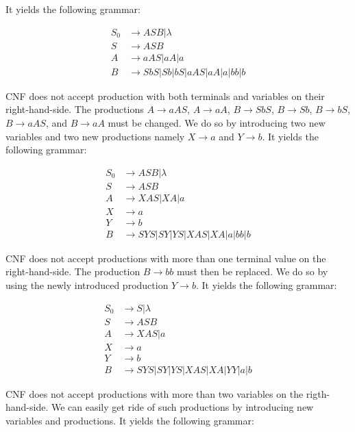 \begin{enumerate}[label={(\alph*)}]
    It yields the following grammar:
    
    \begin{align*}
        S_0 &\rightarrow ASB | \lambda\\
        S &\rightarrow ASB\\
        A &\rightarrow aAS | aA | a\\
        B &\rightarrow SbS | Sb | bS | aAS | aA | a | bb | b
    \end{align*}
    
    \noindent CNF does not accept production with both terminals and variables on their right-hand-side. The productions $A \rightarrow aAS$, $A \rightarrow aA$, $B \rightarrow SbS$, $B \rightarrow Sb$, $B \rightarrow bS$, $B \rightarrow aAS$, and $B \rightarrow aA$ must be changed. We do so by introducing two new variables and two new productions namely $X \rightarrow a$ and $Y \rightarrow b$. It yields the following grammar:
    
    \begin{align*}
        S_0 &\rightarrow ASB | \lambda\\
        S &\rightarrow ASB\\
        A &\rightarrow XAS | XA | a\\
        X &\rightarrow a\\
        Y &\rightarrow b\\
        B &\rightarrow SYS | SY | YS | XAS | XA | a | bb | b
    \end{align*}
    
    \noindent CNF does not accept productions with more than one terminal value on the right-hand-side. The production $B \rightarrow bb$ must then be replaced. We do so by using the newly introduced production $Y \rightarrow b$. It yields the following grammar:
    
    \begin{align*}
        S_0 &\rightarrow S | \lambda\\
        S &\rightarrow ASB\\
        A &\rightarrow XAS | a\\
        X &\rightarrow a\\
        Y &\rightarrow b\\
        B &\rightarrow SYS | SY | YS | XAS | XA | YY | a | b
    \end{align*}
    
    \noindent CNF does not accept productions with more than two variables on the rigth-hand-side. We can easily get ride of such productions by introducing new variables and productions. It yields the following grammar:
    

\end{enumerate}
